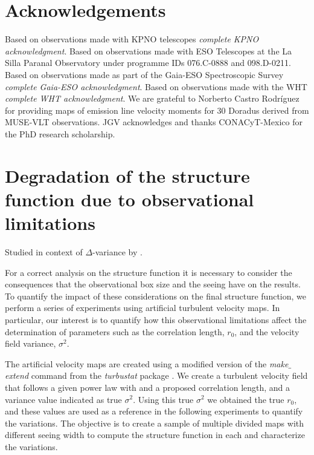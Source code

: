 \documentclass[fleqn,usenatbib, useAMS, a4paper]{mnras}
\begin{document}

\section*{Acknowledgements}

Based on observations made with KPNO telescopes
\textit{complete KPNO acknowledgment}.
Based on observations made with ESO Telescopes at the La Silla Paranal Observatory under programme IDs 076.C-0888 and 098.D-0211.
Based on observations made as part of the Gaia-ESO Spectroscopic Survey
\textit{complete Gaia-ESO acknowledgment}.
Based on observations made with the WHT
\textit{complete WHT acknowledgment}.
We are grateful to Norberto Castro Rodríguez for providing maps of emission line velocity moments for 30 Doradus derived from MUSE-VLT observations.
JGV acknowledges and thanks CONACyT-Mexico for the PhD research scholarship.







\appendix

\section{Degradation of the structure function due to observational limitations}
\label{sec:degr-struct-funct}
Studied in context of \(\Delta\)-variance by \citet{Bensch:2001l}.

For a correct analysis on the structure function it is necessary to consider the consequences that the observational box size and the seeing have on the results.
To quantify the impact of these considerations on the final structure function, we perform a series of experiments using artificial turbulent velocity maps.
In particular, our interest is to quantify how this observational limitations affect the determination of parameters such as the correlation length, \(r_0\), and the velocity field variance, \(\sigma^2 \). 

The artificial velocity maps are created using a modified version of the \textit{make$\_$extend} command from the \textit{turbustat} package \citep{Koch2019AJ....158....1K}.
We create a turbulent velocity field that follows a given power law with and a proposed correlation length, and a variance value indicated as true \(\sigma^2\).
Using this true \(\sigma^2\) we obtained the true \(r_0\), and these values are used as a reference in the following experiments to quantify the variations.
The objective is to create a sample of multiple divided maps with different seeing width to compute the structure function in each and characterize the variations. 
\end{document}
